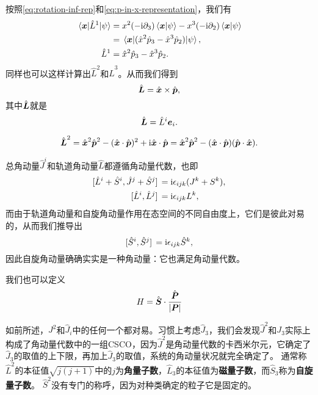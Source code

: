 \documentclass[hyperref, UTF8, a4paper]{ctexart}
\newcommand*{\ii}{\mathrm{i}}
\begin{document}
按照\eqref{eq:rotation-inf-rep}和\eqref{eq:p-in-x-representation}，我们有
\[
    \begin{aligned}
        \mel{\vb*{x}}{\hat{L}^1}{\psi} &= x^2 (- \ii \partial_3) \braket{\vb*{x}}{\psi} - x^3 (- \ii \partial_2) \braket{\vb*{x}}{\psi} \\
        &= \mel{\vb*{x}}{(\hat{x}^2 \hat{p}_3 - \hat{x}^3 \hat{p}_2)}{\psi}, \\
        \hat{L}^1 &= \hat{x}^2 \hat{p}_3 - \hat{x}^3 \hat{p}_2.
    \end{aligned}
\]
同样也可以这样计算出$\hat{L}^2$和$\hat{L}^3$。从而我们得到
\begin{equation}
    \hat{\vb*{L}} = \hat{\vb*{x}} \times \hat{\vb*{p}},
\end{equation}
其中$\hat{\vb*{L}}$就是
\begin{equation}
    \hat{\vb*{L}} = \hat{L}^i \vb*{e}_i.
\end{equation}

\begin{equation}
    \hat{\vb*{L}}^2 = \hat{\vb*{x}}^2 \hat{\vb*{p}}^2 - (\hat{\vb*{x}} \cdot \hat{\vb*{p}})^2 + \ii \hat{\vb*{x}} \cdot \hat{\vb*{p}} = \hat{\vb*{x}}^2 \hat{\vb*{p}}^2 - (\hat{\vb*{x}} \cdot \hat{\vb*{p}}) (\hat{\vb*{p}} \cdot \hat{\vb*{x}}).
\end{equation}

总角动量$\hat{J}^i$和轨道角动量$\hat{L}$都遵循角动量代数，也即
\[
    \begin{aligned}
        \comm*{\hat{L}^i+\hat{S}^i}{\hat{J}^j+\hat{S}^j} &= \ii \epsilon_{ijk} (J^k+S^k), \\
        \comm*{\hat{L}^i}{\hat{L}^j} &= \ii \epsilon_{ijk} L^k,
    \end{aligned}
\]
而由于轨道角动量和自旋角动量作用在态空间的不同自由度上，它们是彼此对易的，从而我们推导出
\[
    \comm*{\hat{S}^i}{\hat{S}^j} = \ii \epsilon_{ijk} \hat{S}^k,
\]
因此自旋角动量确确实实是一种角动量：它也满足角动量代数。

我们也可以定义
\begin{equation}
    H = \hat{\vb*{S}} \cdot \frac{\hat{\vb*{P}}}{\abs{\vb*{P}}}
\end{equation}

如前所述，$J^2$和$\hat{J}_i$中的任何一个都对易。习惯上考虑$\hat{J}_3$，我们会发现$\hat{J}^2$和$J_3$实际上构成了角动量代数中的一组CSCO，因为$\hat{J}^2$是角动量代数的卡西米尔元，它确定了$\hat{J}_3$的取值的上下限，再加上$\hat{J}_3$的取值，系统的角动量状况就完全确定了。
通常称$\hat{L}^2$的本征值$\sqrt{j(j+1)}$中的$j$为\textbf{角量子数}，$\hat{L}_3$的本征值为\textbf{磁量子数}，而$\hat{S}_3$称为\textbf{自旋量子数}。
$\hat{S}^2$没有专门的称呼，因为对种类确定的粒子它是固定的。
\end{document}
